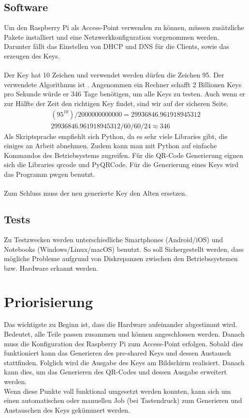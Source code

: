 \documentclass[a4paper,11pt,singlespacing]{article}
\begin{document}
		\subsection{Software}
		Um den Raspberry Pi als Access-Point verwenden zu können, müssen zusätzliche Pakete installiert und eine Netzwerkkonfiguration vorgenommen werden. Darunter fällt das Einstellen von DHCP und DNS für die Clients, sowie das erzeugen des Keys. \\ \\
		Der Key hat 10 Zeichen und verwendet werden dürfen die Zeichen 95. Der verwendete Algorithmus ist . Angenommen ein Rechner schafft 2 Billionen Keys pro Sekunde würde er 346 Tage benötigen, um alle Keys zu testen. Auch wenn er zur Hälfte der Zeit den richtigen Key findet, sind wir auf der sicheren Seite. 
		\begin{eqnarray}
			(95^{10})/2000000000000 =  29936846.961918945312\\
			29936846.961918945312 / 60 /60 /24 \approx 346
		\end{eqnarray}
		Als Skriptsprache empfiehlt sich Python, da es sehr viele Libraries gibt, die einiges an Arbeit abnehmen. Zudem kann man mit Python auf einfache Kommandos des Betriebsystems zugreifen. Für die QR-Code Generierung eignen sich die Libraries qrcode und PyQRCode. Für die Generierung eines Keys wird das Programm pwgen benutzt.\\ \\
		Zum Schluss muss der neu generierte Key den Alten ersetzen.
		
		\subsection{Tests}
		Zu Testzwecken werden unterschiedliche Smartphones (Android/iOS) und Notebooks (Windows/Linux/macOS) benutzt. So soll Sichergestellt werden, dass mögliche Probleme aufgrund von Diskrepanzen zwischen den Betriebssystemen bzw. Hardware erkannt werden.
	
	\section{Priorisierung}
	
	Das wichtigste zu Beginn ist, dass die Hardware aufeinander abgestimmt wird. Bedeutet, alle Teile passen zusammen und können angeschlossen werden.
	Danach muss die Konfiguration des Raspberry Pi zum Access-Point erfolgen. Sobald dies funktioniert kann das Generieren des pre-shared Keys und dessen Austausch stattfinden. Folglich wird die Ausgabe des Keys am Bildschirm realisiert. Danach kann dies, um das Generieren des QR-Codes und dessen Ausgabe erweitert werden.\\
	Wenn diese Punkte voll funktional umgesetzt werden konnten, kann sich um einen automatischen oder manuellen Job (bei Tastendruck) zum Generieren und Austauschen des Keys gekümmert werden.
		
\end{document}

